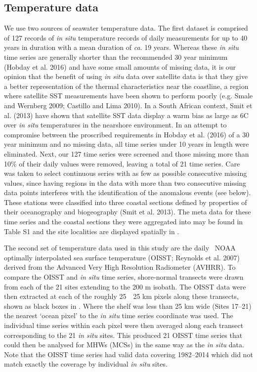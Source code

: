 \documentclass[a4paper,10pt,review]{elsarticle}
\begin{document}
\subsection{Temperature data}
We use two sources of seawater temperature data. The first dataset is comprised of 127 records of \emph{in situ} temperature records of daily measurements for up to 40 years in duration with a mean duration of \emph{ca}. 19 years. Whereas these \emph{in situ} time series are generally shorter than the recommended 30 year minimum (Hobday et al. 2016) and have some small amounts of missing data, it is our opinion that the benefit of using \emph{in situ} data over satellite data is that they give a better representation of the thermal characteristics near the coastline, a region where satellite SST measurements have been shown to perform poorly (e.g. Smale and Wernberg 2009; Castillo and Lima 2010). In a South African context, Smit et al. (2013) have shown that satellite SST data display a warm bias as large as 6\degree C over \emph{in situ} temperatures in the nearshore environment. In an attempt to compromise between the proscribed requirements in Hobday et al. (2016) of a 30 year minimum and no missing data, all time series under 10 years in length were eliminated. Next, our 127 time series were screened and those missing more than 10\% of their daily values were removed, leaving a total of 21 time series. Care was taken to select continuous series with as few as possible consecutive missing values, since having regions in the data with more than two consecutive missing data points interferes with the identification of the anomalous events (see below). These stations were classified into three coastal sections defined by properties of their oceanography and biogeography (Smit et al. 2013). The meta data for these time series and the coastal sections they were aggregated into may be found in Table S1  and the site localities are displayed spatially in .

The second set of temperature data used in this study are the daily \degree~NOAA optimally interpolated sea surface temperature (OISST; Reynolds et al. 2007) derived from the Advanced Very High Resolution Radiometer (AVHRR). To compare the OISST and \emph{in situ} time series, shore-normal transects were drawn from each of the 21 sites extending to the 200 m isobath. The OISST data were then extracted at each of the roughly 25~\texttimes~25 km pixels along these transects, shown as black boxes in . Where the shelf was less than 25 km wide (Sites 17--21) the nearest `ocean pixel' to the \emph{in situ} time series coordinate was used. The individual time series within each pixel were then averaged along each transect corresponding to the 21 \emph{in situ} sites. This produced 21 OISST time series that could then be analysed for MHWs (MCSs) in the same way as the \emph{in situ} data. Note that the OISST time series had valid data covering 1982--2014 which did not match exactly the coverage by individual \emph{in situ} sites.
\end{document}
